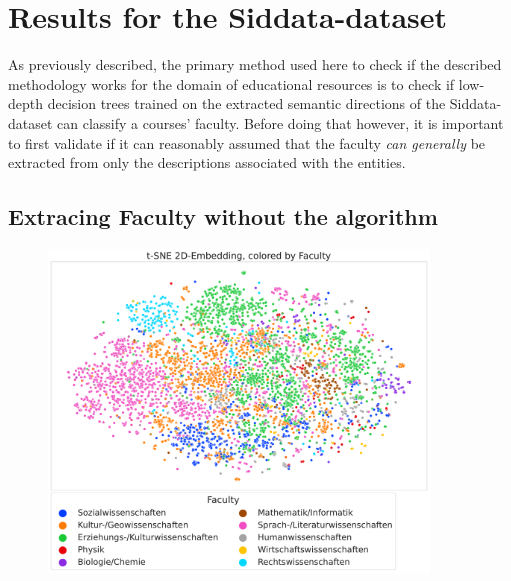 \section{Results for the Siddata-dataset}
\label{sec:results_siddata}


As previously described, the primary method used here to check if the described methodology works for the domain of educational resources is to check if low-depth decision trees trained on the extracted semantic directions of the Siddata-dataset can classify a courses' faculty. Before doing that however, it is important to first validate if it can reasonably assumed that the faculty \textit{can generally} be extracted from only the descriptions associated with the entities.

\subsection*{Extracing Faculty without the algorithm}

\begin{figure}[h]
	\begin{center}
	  \includegraphics[width=0.9\textwidth]{graphics/dataset_new/scatter_mds_tsne_e2a70a9bf2.pdf}
	  \label{fig:scatter_mds_siddata}
	\end{center}
\end{figure}

